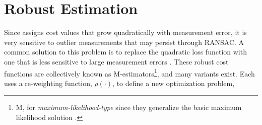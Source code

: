 \section{Robust Estimation}
Since  assigns cost values that grow quadratically with measurement error, it is very sensitive to outlier measurements that may persist through RANSAC.
A common solution to this problem is to replace the quadratic loss function with one that is less sensitive to large measurement errors \citep{MacTavish2015-wt}.
These robust cost functions are collectively known as M-estimators\footnote{M, for \textit{maximum-likelihood-type} since they generalize the basic maximum likelihood solution \citep{Barfoot2017-ri}.}, and many variants exist. Each uses a re-weighting function, $\rho(\cdot)$, to define a new optimization problem,

